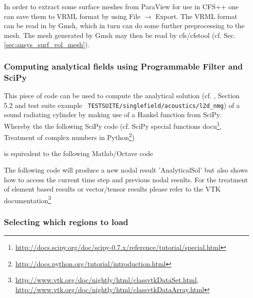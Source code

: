 In order to extract some surface meshes from ParaView for use in CFS++ one can
save them to  VRML format by using File $\rightarrow$  Export. The VRML format
can be read in by Gmsh, which in turn can do some further preprocessing to the
mesh.  The   mesh  generated  by  Gmsh   may  then  be   read  by  cfs/cfstool
(cf. Sec. \ref{sec:ansys_surf_vol_mesh}).

\subsubsection{Computing analytical fields using Programmable Filter and SciPy }

This  piece of  code  can be  used  to compute  the  analytical solution  (cf.
\cite{Triebenbacher2006},   Section   5.2   and   test  suite   example   {\tt
TESTSUITE/singlefield/acoustics/l2d\_nmg})  of a  sound radiating  cylinder by
making use  of a Hankel function  from SciPy. Whereby the  the following SciPy
code            (cf.             SciPy            special            functions
docu\footnote{\url{http://docs.scipy.org/doc/scipy-0.7.x/reference/tutorial/special.html}},
Treatment             of             complex            numbers             in
Python\footnote{\url{http://docs.python.org/tutorial/introduction.html}})



\noindent is equivalent to the following Matlab/Octave code



\noindent The following  code will produce a new  nodal result 'AnalyticalSol'
but also shows how to access the current time step and previous nodal results.
For the  treatment of  element based results  or vector/tensor  results please
refer                      to                      the                     VTK
documentation\footnote{\url{http://www.vtk.org/doc/nightly/html/classvtkDataSet.html},\\\url{http://www.vtk.org/doc/nightly/html/classvtkDataArray.html}}




\subsubsection{Selecting which regions to load}

